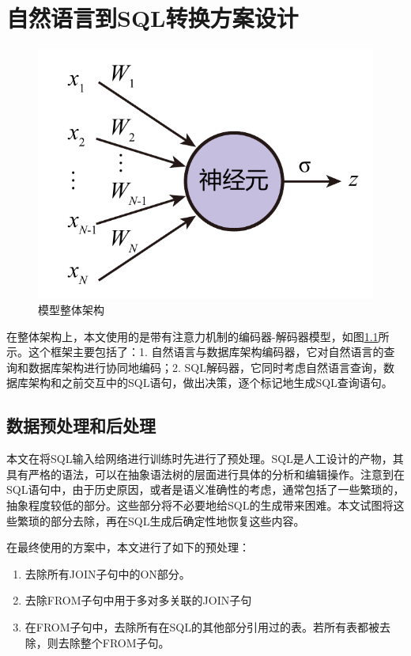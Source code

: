 \chapter{自然语言到SQL转换方案设计}

\begin{figure}
    \centering
    \includegraphics[page=6,width=\linewidth]{figure/figures.pdf}
    \caption{模型整体架构}
    \label{arch}
\end{figure}

在整体架构上，本文使用的是带有注意力机制的编码器-解码器模型，如图\ref{arch}所示。这个框架主要包括了：1. 自然语言与数据库架构编码器，它对自然语言的查询和数据库架构进行协同地编码；2. SQL解码器，它同时考虑自然语言查询，数据库架构和之前交互中的SQL语句，做出决策，逐个标记地生成SQL查询语句。

\section{数据预处理和后处理}

本文在将SQL输入给网络进行训练时先进行了预处理。SQL是人工设计的产物，其具有严格的语法，可以在抽象语法树的层面进行具体的分析和编辑操作。注意到在SQL语句中，由于历史原因，或者是语义准确性的考虑，通常包括了一些繁琐的，抽象程度较低的部分。这些部分将不必要地给SQL的生成带来困难。本文试图将这些繁琐的部分去除，再在SQL生成后确定性地恢复这些内容。

在最终使用的方案中，本文进行了如下的预处理：
\begin{enumerate}
    \item 去除所有JOIN子句中的ON部分。
    \item 去除FROM子句中用于多对多关联的JOIN子句
    \item 在FROM子句中，去除所有在SQL的其他部分引用过的表。若所有表都被去除，则去除整个FROM子句。
\end{enumerate}

